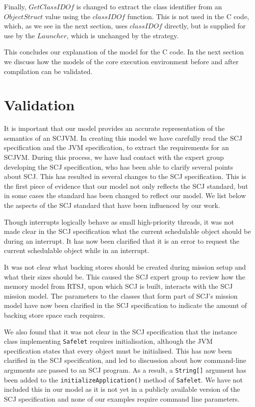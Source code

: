 Finally, $GetClassIDOf$ is changed to extract the class identifier
from an $ObjectStruct$ value using the $classIDOf$ function.
This is not used in the C code, which, as we see in the next section,
uses $classIDOf$ directly, but is supplied for use by the $Launcher$,
which is unchanged by the strategy.

This concludes our explanation of the model for the C code. 
In the next section we discuss how the models of the core execution
environment before and after compilation can be validated.

\section{Validation}
\label{cee-validation-section}

It is important that our model provides an accurate representation of
the semantics of an SCJVM.
In creating this model we have carefully read the SCJ specification
and the JVM specification, to extract the requirements for an SCJVM.
During this process, we have had contact with the expert group
developing the SCJ specification, who has been able to clarify several
points about SCJ.
This has resulted in several changes to the SCJ specification.
This is the first piece of evidence that our model not only reflects
the SCJ standard, but in some cases the standard has been changed to
reflect our model. 
We list below the aspects of the SCJ standard that have been
influenced by our work. 

Though interrupts logically behave as small high-priority threads, it
was not made clear in the SCJ specification what the current
schedulable object should be during an interrupt.
It has now been clarified that it is an error to request the current
schedulable object while in an interrupt.

It was not clear what backing stores should be created during mission
setup and what their sizes should be.
This caused the SCJ expert group to review how the memory model from
RTSJ, upon which SCJ is built, interacts with the SCJ mission model.
The parameters to the classes that form part of SCJ's mission model
have now been clarified in the SCJ specification to indicate the
amount of backing store space each requires.

We also found that it was not clear in the SCJ specification that the
instance class implementing \texttt{Safelet} requires initialisation,
although the JVM specification states that every object must be
initialised.
This has now been clarified in the SCJ specification, and led to
discussion about how command-line arguments are passed to an SCJ
program. 
As a result, a \texttt{String[]} argument has been added to the
\texttt{initializeApplication()} method of \texttt{Safelet}.
We have not included this in our model as it is not yet in a publicly
available version of the SCJ specification and none of our examples
require command line parameters.

